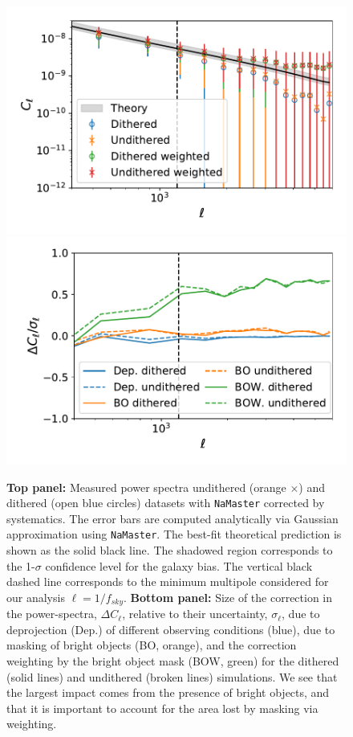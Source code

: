 \documentclass[twocolumn]{aastex62}
\begin{document}
\begin{figure}
\centering
\includegraphics[width=0.9\columnwidth]{Cl_results_2019_comp}
\includegraphics[width=0.9\columnwidth]{systematics_comp_abs}
\caption{{\bf Top panel:} Measured power spectra undithered (orange $\times$) and dithered (open blue circles) datasets with \texttt{NaMaster} corrected by systematics. The error bars are computed analytically via Gaussian approximation using \texttt{NaMaster}. The best-fit theoretical prediction is shown as the solid black line. The shadowed region corresponds to the 1-$\sigma$ confidence level for the galaxy bias. The vertical black dashed line corresponds to the minimum multipole considered for our analysis $\ell = 1/f_{sky}$. {\bf Bottom panel:} Size of the correction in the power-spectra, $\Delta C_{\ell}$, relative to their uncertainty, $\sigma_{\ell}$, due to deprojection (Dep.) of different observing conditions (blue), due to masking of bright objects (BO, orange), and the correction weighting by the bright object mask (BOW, green) for the dithered (solid lines) and undithered (broken lines) simulations. We see that the largest impact comes from the presence of bright objects, and that it is important to account for the area lost by masking via weighting.}
\label{fig:power_spectra}
\end{figure}
\end{document}
